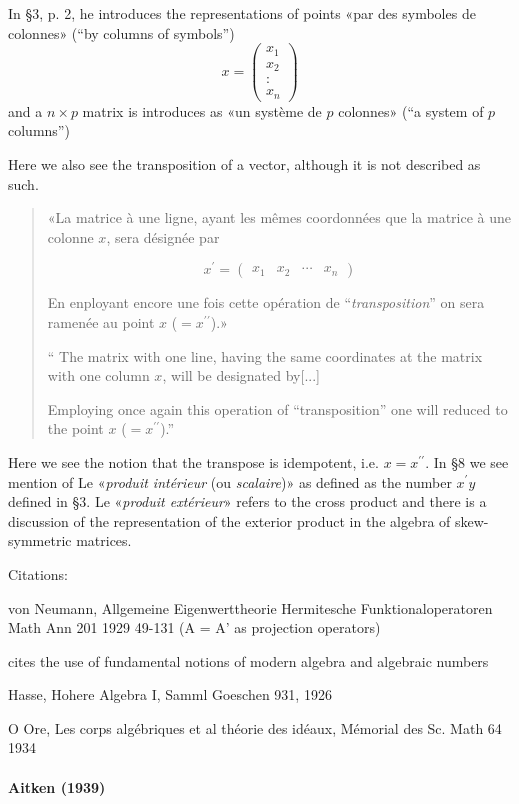In \S 3, p. 2, he introduces the representations of points «par des symboles de colonnes» (``by columns of symbols'')
\[
x =\begin{pmatrix}x_1\\x_2\\:\\x_n\end{pmatrix}
\]
and a $n \times p$ matrix is introduces as «un système de $p$ colonnes» (``a system of $p$ columns'')

Here we also see the transposition of a vector, although it is not described as such.
\begin{quote}
«La matrice à une ligne, ayant les mêmes coordonnées que la matrice à une colonne $x$, sera désignée par

\[
x^\prime = \begin{pmatrix}x_1 & x_2 & \cdots & x_n\end{pmatrix}
\]

En enployant encore une fois cette opération de ``\textit{transposition}'' on sera ramenée au point $x$ ($= x^{\prime\prime}$).»

``
The matrix with one line, having the same coordinates at the matrix with one column $x$, will be designated by[...]

Employing once again this operation of ``transposition'' one will reduced to the point $x$ ($= x^{\prime\prime}$).''

\end{quote}
Here we see the notion that the transpose is idempotent, i.e. $x = x^{\prime\prime}$.
In \S 8 we see mention of Le «\textit{produit intérieur} (ou \textit{scalaire})» as defined as the number $x^\prime y$ defined in \S 3. Le «\textit{produit extérieur}» refers to the cross product and there is a discussion of the representation of the exterior product in the algebra of skew-symmetric matrices.

Citations:

von Neumann, Allgemeine Eigenwerttheorie Hermitesche Funktionaloperatoren
Math Ann 201 1929 49-131 (A = A' as projection operators)

cites the use of fundamental notions of modern algebra and algebraic numbers

Hasse, Hohere Algebra I, Samml  Goeschen 931, 1926

O Ore, Les corps algébriques et al théorie des idéaux, Mémorial des Sc. Math 64 1934


\paragraph{Aitken (1939)~\cite{Aitken1939}}

